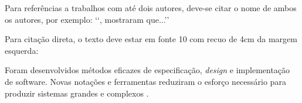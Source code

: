 Para referências a trabalhos com até dois autores, deve-se citar o nome de 
ambos os autores, por exemplo: \lq\lq {}, mostraram 
que...\rq\rq

Para citação direta, o texto deve estar em fonte 10 com recuo de 4cm da margem esquerda:

\begin{citacao}
Foram desenvolvidos métodos eficazes de especificação, \textit{design} e implementação de software.  Novas notações e ferramentas reduziram o esforço necessário para produzir sistemas grandes e complexos \cite{Sommerville2007}.
\end{citacao}


